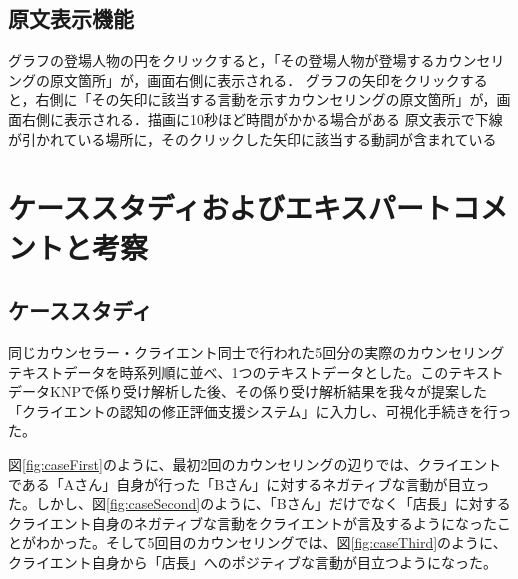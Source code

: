 \documentclass[shuuron]{kuee}
\begin{document}
\subsection{原文表示機能}

グラフの登場人物の円をクリックすると，「その登場人物が登場するカウンセリングの原文箇所」が，画面右側に表示される．
グラフの矢印をクリックすると，右側に「その矢印に該当する言動を示すカウンセリングの原文箇所」が，画面右側に表示される．描画に10秒ほど時間がかかる場合がある
原文表示で下線が引かれている場所に，そのクリックした矢印に該当する動詞が含まれている




\section{ケーススタディおよびエキスパートコメントと考察}

\subsection{ケーススタディ}

同じカウンセラー・クライエント同士で行われた5回分の実際のカウンセリングテキストデータを時系列順に並べ、1つのテキストデータとした。このテキストデータKNPで係り受け解析した後、その係り受け解析結果を我々が提案した「クライエントの認知の修正評価支援システム」に入力し、可視化手続きを行った。

図\ref{fig:caseFirst}のように、最初2回のカウンセリングの辺りでは、クライエントである「Aさん」自身が行った「Bさん」に対するネガティブな言動が目立った。しかし、図\ref{fig:caseSecond}のように、「Bさん」だけでなく「店長」に対するクライエント自身のネガティブな言動をクライエントが言及するようになったことがわかった。そして5回目のカウンセリングでは、図\ref{fig:caseThird}のように、クライエント自身から「店長」へのポジティブな言動が目立つようになった。
\end{document}
